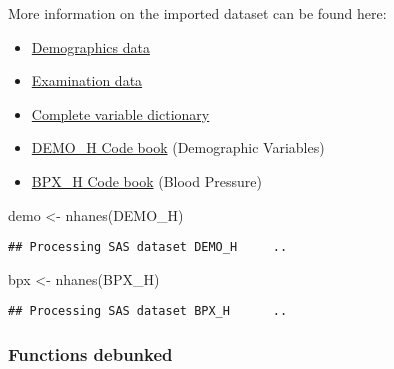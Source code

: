 \documentclass[
]{book}
\newenvironment{Shaded}{\begin{snugshade}}{\end{snugshade}}
\newcommand{\FunctionTok}[1]{\textcolor[rgb]{0.00,0.00,0.00}{#1}}
\newcommand{\NormalTok}[1]{#1}
\newcommand{\OtherTok}[1]{\textcolor[rgb]{0.56,0.35,0.01}{#1}}
\newcommand{\StringTok}[1]{\textcolor[rgb]{0.31,0.60,0.02}{#1}}
\providecommand{\tightlist}{%
  \setlength{\itemsep}{0pt}\setlength{\parskip}{0pt}}
\begin{document}
More information on the imported dataset can be found here:

\begin{itemize}
\tightlist
\item
  \href{https://wwwn.cdc.gov/nchs/nhanes/search/datapage.aspx?Component=Demographics\&CycleBeginYear=2013}{Demographics data}
\item
  \href{https://wwwn.cdc.gov/nchs/nhanes/search/datapage.aspx?Component=Examination\&CycleBeginYear=2013}{Examination data}
\item
  \href{https://wwwn.cdc.gov/Nchs/Nhanes/Search/variablelist.aspx?Component=Demographics\&CycleBeginYear=2013}{Complete variable dictionary}
\item
  \href{https://wwwn.cdc.gov/Nchs/Nhanes/2013-2014/DEMO_H.htm\#Codebook}{DEMO\_H Code book} (Demographic Variables)
\item
  \href{https://wwwn.cdc.gov/Nchs/Nhanes/2013-2014/BPX_H.htm\#Codebook}{BPX\_H Code book} (Blood Pressure)
\end{itemize}

\begin{Shaded}
\begin{Highlighting}[]
\NormalTok{demo }\OtherTok{\textless{}{-}} \FunctionTok{nhanes}\NormalTok{(}\StringTok{\textquotesingle{}DEMO\_H\textquotesingle{}}\NormalTok{)}
\end{Highlighting}
\end{Shaded}

\begin{verbatim}
## Processing SAS dataset DEMO_H     ..
\end{verbatim}

\begin{Shaded}
\begin{Highlighting}[]
\NormalTok{bpx }\OtherTok{\textless{}{-}} \FunctionTok{nhanes}\NormalTok{(}\StringTok{\textquotesingle{}BPX\_H\textquotesingle{}}\NormalTok{)}
\end{Highlighting}
\end{Shaded}

\begin{verbatim}
## Processing SAS dataset BPX_H      ..
\end{verbatim}

\hypertarget{functions-debunked-10}{%
\subsubsection{Functions debunked}\label{functions-debunked-10}}
\end{document}
